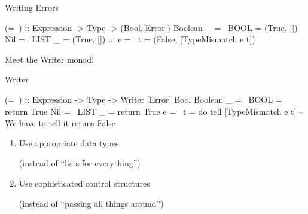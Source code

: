\begin{frame}[fragile]{Writing Errors}

  \begin{block}{}
    \begin{code}
      (=~) :: Expression -> Type -> (Bool,[Error])
      Boolean _ =~ BOOL   = (True, [])
      Nil       =~ LIST _ = (True, [])
      ...
      e         =~ t      = (False, [TypeMismatch e t])
    \end{code}
  \end{block}

  Meet the Writer monad!

  \begin{block}{Writer}
    \begin{code}
      (=~) :: Expression -> Type -> Writer [Error] Bool
      Boolean _ =~ BOOL   = return True
      Nil       =~ LIST _ = return True
      e         =~ t      = do
        tell [TypeMismatch e t] -- We have to tell it
        return False
    \end{code}
  \end{block}

\end{frame}






  \begin{enumerate}
    \item Use appropriate data types

          (instead of ``lists for everything'')

    \bigskip

    \item Use sophisticated control structures

          (instead of ``passing all things around'')
  \end{enumerate}

